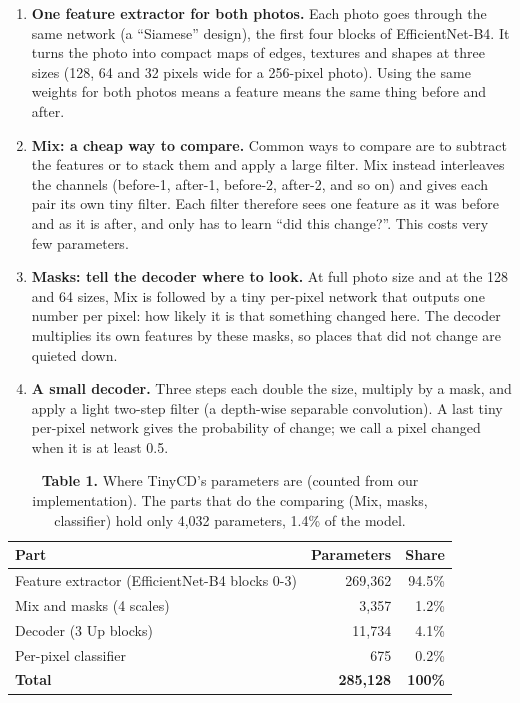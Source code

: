 \documentclass[10pt,a4paper]{article}
\begin{document}
\begin{enumerate}\item \textbf{One feature extractor for both photos.} Each photo goes through the same network (a ``Siamese'' design), the first four blocks of EfficientNet-B4. It turns the photo into compact maps of edges, textures and shapes at three sizes (128, 64 and 32 pixels wide for a 256-pixel photo). Using the same weights for both photos means a feature means the same thing before and after.
\item \textbf{Mix: a cheap way to compare.} Common ways to compare are to subtract the features or to stack them and apply a large filter. Mix instead interleaves the channels (before-1, after-1, before-2, after-2, and so on) and gives each pair its own tiny filter. Each filter therefore sees one feature as it was before and as it is after, and only has to learn ``did this change?''. This costs very few parameters.
\item \textbf{Masks: tell the decoder where to look.} At full photo size and at the 128 and 64 sizes, Mix is followed by a tiny per-pixel network that outputs one number per pixel: how likely it is that something changed here. The decoder multiplies its own features by these masks, so places that did not change are quieted down.
\item \textbf{A small decoder.} Three steps each double the size, multiply by a mask, and apply a light two-step filter (a depth-wise separable convolution). A last tiny per-pixel network gives the probability of change; we call a pixel changed when it is at least 0.5.
\end{enumerate}
\begin{table}[h!]\centering\small
\begin{tabular}{lrr}
\toprule
Part & Parameters & Share \\
\midrule
Feature extractor (EfficientNet-B4 blocks 0-3) & 269,362 & 94.5\% \\
Mix and masks (4 scales) & 3,357 & 1.2\% \\
Decoder (3 Up blocks) & 11,734 & 4.1\% \\
Per-pixel classifier & 675 & 0.2\% \\
\textbf{Total} & \textbf{285,128} & \textbf{100\%} \\
\bottomrule
\end{tabular}
\caption*{\textbf{Table 1.} Where TinyCD's parameters are (counted from our implementation). The parts that do the comparing (Mix, masks, classifier) hold only 4,032 parameters, 1.4\% of the model.}\end{table}
\end{document}
